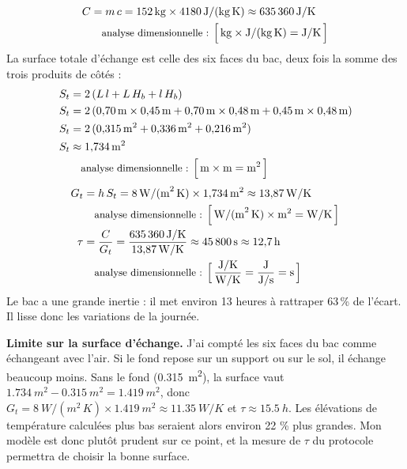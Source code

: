 \begin{demonstration}
\begin{align*}
C &= m\,c = \qty{152}{kg} \times \qty{4180}{J/(kg\,K)} \approx \qty{635360}{J/K}\\
\dimline{\unit{kg}\times\unit{J/(kg\,K)}=\unit{J/K}}
\end{align*}
La surface totale d'échange est celle des six faces du bac, deux fois la somme des trois produits de côtés :
\begin{align*}
S_t &= 2\,(L\,l + L\,H_b + l\,H_b)\\
S_t &= 2\,(\qty{0,70}{m}\times\qty{0,45}{m} + \qty{0,70}{m}\times\qty{0,48}{m} + \qty{0,45}{m}\times\qty{0,48}{m})\\
S_t &= 2\,(\qty{0,315}{m^2} + \qty{0,336}{m^2} + \qty{0,216}{m^2})\\
S_t &\approx \qty{1,734}{m^2}\\
\dimline{\unit{m}\times\unit{m}=\unit{m^2}}
\end{align*}
\begin{align*}
G_t &= h\,S_t = \qty{8}{W/(m^2\,K)} \times \qty{1,734}{m^2} \approx \qty{13,87}{W/K}\\
\dimline{\unit{W/(m^2\,K)}\times\unit{m^2}=\unit{W/K}}\\
\tau &= \frac{C}{G_t} = \frac{\qty{635360}{J/K}}{\qty{13,87}{W/K}} \approx \qty{45800}{s} \approx \qty{12,7}{h}\\
\dimline{\dfrac{\unit{J/K}}{\unit{W/K}}=\dfrac{\unit{J}}{\unit{J/s}}=\unit{s}}
\end{align*}
Le bac a une grande inertie : il met environ 13 heures à rattraper 63\,\% de l'écart. Il lisse donc les variations de la journée.
\end{demonstration}

\textbf{Limite sur la surface d'échange.} J'ai compté les six faces du bac comme échangeant avec l'air. Si le fond repose sur un support ou sur le sol, il échange beaucoup moins. Sans le fond (\qty{0,315}{m^2}), la surface vaut $\qty{1,734}{m^2} - \qty{0,315}{m^2} = \qty{1,419}{m^2}$, donc $G_t = \qty{8}{W/(m^2\,K)} \times \qty{1,419}{m^2} \approx \qty{11,35}{W/K}$ et $\tau \approx \qty{15,5}{h}$. Les élévations de température calculées plus bas seraient alors environ 22 \% plus grandes. Mon modèle est donc plutôt prudent sur ce point, et la mesure de $\tau$ du protocole permettra de choisir la bonne surface.

